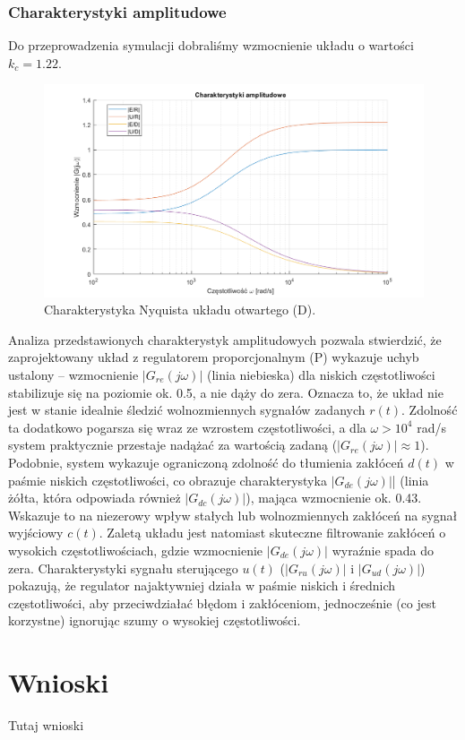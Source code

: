 \documentclass[12pt,a4paper]{article}
\begin{document}
	\subsubsection{Charakterystyki amplitudowe}
		
		Do przeprowadzenia symulacji dobraliśmy wzmocnienie układu o wartości $k_c = 1.22$.
				
		\begin{figure}[H]
			\centering
			\includegraphics[width=0.8\linewidth]{zdjecia/char_czest_ukladu_D.png}
			\caption{Charakterystyka Nyquista układu otwartego (D).}
			\label{fig:char_czest_ukladu_D}
		\end{figure}
		
		Analiza przedstawionych charakterystyk amplitudowych pozwala stwierdzić, że zaprojektowany układ z regulatorem proporcjonalnym (P) wykazuje uchyb ustalony – wzmocnienie $|G_{re}(j\omega)|$ (linia niebieska) dla niskich częstotliwości stabilizuje się na poziomie ok. 0.5, a nie dąży do zera. Oznacza to, że układ nie jest w stanie idealnie śledzić wolnozmiennych sygnałów zadanych $r(t)$. Zdolność ta dodatkowo pogarsza się wraz ze wzrostem częstotliwości, a dla $\omega > 10^4$ rad/s system praktycznie przestaje nadążać za wartością zadaną ($|G_{re}(j\omega)| \approx 1$). Podobnie, system wykazuje ograniczoną zdolność do tłumienia zakłóceń $d(t)$ w paśmie niskich częstotliwości, co obrazuje charakterystyka $|G_{de}(j\omega)|$| (linia żółta, która odpowiada również $|G_{dc}(j\omega)|$), mająca wzmocnienie ok. 0.43. Wskazuje to na niezerowy wpływ stałych lub wolnozmiennych zakłóceń na sygnał wyjściowy $c(t)$. Zaletą układu jest natomiast skuteczne filtrowanie zakłóceń o wysokich częstotliwościach, gdzie wzmocnienie $|G_{de}(j\omega)|$ wyraźnie spada do zera. Charakterystyki sygnału sterującego $u(t)$ ($|G_{ru}(j\omega)|$ i $|G_{ud}(j\omega)|$) pokazują, że regulator najaktywniej działa w paśmie niskich i średnich częstotliwości, aby przeciwdziałać błędom i zakłóceniom, jednocześnie (co jest korzystne) ignorując szumy o wysokiej częstotliwości.
			
	\section{Wnioski}
	Tutaj wnioski
	
\end{document}
